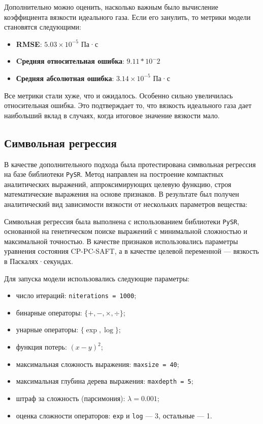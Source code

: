 \documentclass[a4paper,12pt]{article}
\begin{document}
    Дополнительно можно оценить, насколько важным было вычисление коэффициента вязкости идеального газа. Если его занулить, то метрики модели становятся следующими:
    \begin{itemize}
      \item \textbf{RMSE}: \(5.03 \times 10^{-5} \) Па·с
      \item \textbf{Cредняя относительная ошибка}: \(9.11*10^-2\)
      \item \textbf{Средняя абсолютная ошибка}: \(3.14 \times 10^{-5} \) Па·с
    \end{itemize}

    Все метрики стали хуже, что и ожидалось. Особенно сильно увеличилась относительная ошибка. Это подтверждает то, что вязкость идеального газа дает наибольший вклад в случаях, когда итоговое значение вязкости мало.

  \subsection{Символьная регрессия}

    В качестве дополнительного подхода была протестирована символьная регрессия на базе библиотеки \texttt{PySR}. Метод направлен на построение компактных аналитических выражений, аппроксимирующих целевую функцию, строя математические выражения на основе признаков. В результате был получен аналитический вид зависимости вязкости от нескольких параметров вещества:

    Символьная регрессия была выполнена с использованием библиотеки \texttt{PySR}, основанной на генетическом поиске выражений с минимальной сложностью и максимальной точностью. В качестве признаков использовались параметры уравнения состояния CP-PC-SAFT, а в качестве целевой переменной — вязкость в Паскалях·секундах.

Для запуска модели использовались следующие параметры:

\begin{itemize}
  \item число итераций: \texttt{niterations = 1000};
  \item бинарные операторы: \( \{+, -, \times, \div \} \);
  \item унарные операторы: \( \{\exp, \log\} \);
  \item функция потерь: \( (x - y)^2 \);
  \item максимальная сложность выражения: \texttt{maxsize = 40};
  \item максимальная глубина дерева выражения: \texttt{maxdepth = 5};
  \item штраф за сложность (парсимония): \( \lambda = 0.001 \);
  \item оценка сложности операторов: \texttt{exp} и \texttt{log} — 3, остальные — 1.
\end{itemize}
\end{document}
